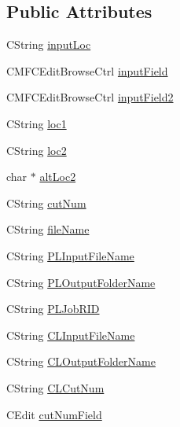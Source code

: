 \subsection*{Public Attributes}
\begin{DoxyCompactItemize}
\item 
C\+String \hyperlink{class_c_m_f_c_application1_dlg_a2437f8ccfcd7e68b193eb65726d83e0c}{input\+Loc}
\item 
C\+M\+F\+C\+Edit\+Browse\+Ctrl \hyperlink{class_c_m_f_c_application1_dlg_a595cdf608e0c42c496be80ad5a73bac6}{input\+Field}
\item 
C\+M\+F\+C\+Edit\+Browse\+Ctrl \hyperlink{class_c_m_f_c_application1_dlg_a7b144af367c9212a94c17347e9e36cde}{input\+Field2}
\item 
C\+String \hyperlink{class_c_m_f_c_application1_dlg_acff9ff0c6e0fec5c97a149cde367a5bc}{loc1}
\item 
C\+String \hyperlink{class_c_m_f_c_application1_dlg_aea92aa538aaacc18fd6a46e695dded3f}{loc2}
\item 
char $\ast$ \hyperlink{class_c_m_f_c_application1_dlg_a4d4393a564e204ba0988f51340e8149d}{alt\+Loc2}
\item 
C\+String \hyperlink{class_c_m_f_c_application1_dlg_a38c41fe983d4e5481b5f1fbc27efb68c}{cut\+Num}
\item 
C\+String \hyperlink{class_c_m_f_c_application1_dlg_a9983a3123f1dba3af7af291de88057cb}{file\+Name}
\item 
C\+String \hyperlink{class_c_m_f_c_application1_dlg_a30ebcfe8d0519dd80cfb5c7112f8c1d6}{P\+L\+Input\+File\+Name}
\item 
C\+String \hyperlink{class_c_m_f_c_application1_dlg_a423f6a89b2e29996bade428103d298b0}{P\+L\+Output\+Folder\+Name}
\item 
C\+String \hyperlink{class_c_m_f_c_application1_dlg_a0f73c9847ac0f54c621f65caeb8be89a}{P\+L\+Job\+R\+I\+D}
\item 
C\+String \hyperlink{class_c_m_f_c_application1_dlg_a68a8d63e619d92a8e143b7e6ee718989}{C\+L\+Input\+File\+Name}
\item 
C\+String \hyperlink{class_c_m_f_c_application1_dlg_a8dd80944fb9d8bd8476da534c338facb}{C\+L\+Output\+Folder\+Name}
\item 
C\+String \hyperlink{class_c_m_f_c_application1_dlg_a351e3d098afffcaebf7294d80f21a21f}{C\+L\+Cut\+Num}
\item 
C\+Edit \hyperlink{class_c_m_f_c_application1_dlg_a3b5208f3b69e2d263f108ce76eda06b9}{cut\+Num\+Field}
\item 

\end{DoxyCompactItemize}
